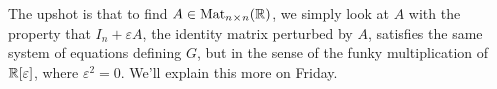 The upshot is that to find $A \in \text{Mat}_{n \hspace{0.05em}{\times}\hspace{0.05em} n}(\mathbb R)$, we simply look at $A$ with the property that $I_n + \varepsilon A$, the identity matrix perturbed by $A$, satisfies the same system of equations defining $G$, but in the sense of the funky multiplication of $\mathbb R[\varepsilon]$, where $\varepsilon^2 = 0.$ We'll explain this more on Friday.

\newpage